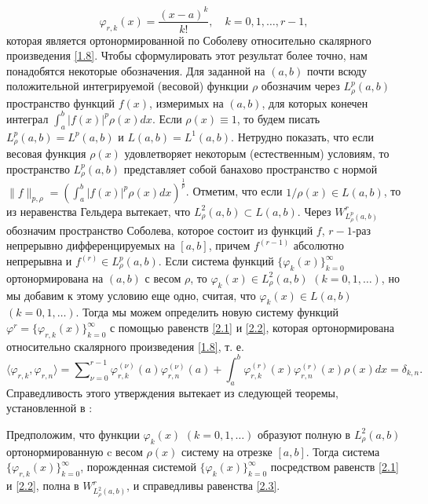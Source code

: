 \begin{equation}\label{2.2}
\varphi_{r,k}(x) =\frac{(x-a)^k}{k!}, \quad k=0,1,\ldots, r-1,
\end{equation}
которая является   ортонормированной по Соболеву относительно скалярного произведения \eqref{1.8}. Чтобы сформулировать  этот результат более точно, нам понадобятся некоторые обозначения. Для заданной на $(a,b)$ почти всюду положительной интегрируемой  (весовой) функции $\rho$ обозначим через $L^p_\rho(a,b)$  пространство  функций $f(x)$, измеримых  на  $(a,b)$, для которых конечен интеграл $\int_a^b|f(x)|^p\rho(x)dx$. Если $\rho(x)\equiv1$, то будем писать $L^p_\rho(a,b)=L^p(a,b)$ и $L(a,b)=L^1(a,b)$. Нетрудно показать, что если весовая функция $\rho(x)$ удовлетворяет некоторым (естественным) условиям, то пространство $L^p_\rho(a,b)$ представляет собой банахово пространство с нормой $\|f\|_{p,\rho}=(\int_a^b|f(x)|^p\rho(x)dx)^\frac1p$. Отметим, что если $1/\rho(x)\in L(a,b)$, то из  неравенства Гельдера вытекает, что $L^2_\rho(a,b)\subset L(a,b)$. Через $W^r_{L^p_\rho(a,b)}$ обозначим пространство Соболева, которое состоит из функций $f$, $r-1$-раз непрерывно дифференцируемых на $[a,b]$, причем $f^{(r-1)}$ абсолютно непрерывна и  $f^{(r)}\in L^p_\rho(a,b)$. Если система функций $\{\varphi_k(x)\}_{k=0}^\infty$ ортонормирована на $(a,b)$ с весом $\rho$, то $\varphi_k(x)\in L^2_\rho(a,b)$ $(k=0,1,\ldots)$, но мы добавим к этому условию еще одно, считая, что $\varphi_k(x)\in L(a,b)$ $(k=0,1,\ldots)$. Тогда мы можем определить новую систему функций $\varphi^r=\{\varphi_{r,k}(x)\}_{k=0}^\infty$ с помощью равенств \eqref{2.1} и \eqref{2.2}, которая ортонормирована относительно скалярного произведения \eqref{1.8}, т. е.
\begin{equation}\label{2.3}
\langle\varphi_{r,k},\varphi_{r,n}\rangle=\sum\nolimits_{\nu=0}^{r-1}\varphi_{r,k}^{(\nu)}(a)\varphi_{r,n}^{(\nu)}(a)+
\int_{a}^{b}\varphi_{r,k}^{(r)}(x)\varphi_{r,n}^{(r)}(x)\rho(x)dx=\delta_{k,n}.
\end{equation}
Справедливость этого утверждения вытекает из следующей теоремы,   установленной в \cite{SharIzv2018}:
\begin{theorem}\label{th1} Предположим, что    функции $\varphi_k(x)$ $(k=0,1,\ldots)$ образуют полную в $L^2_\rho(a,b)$ ортонормированную   c весом   $\rho(x)$ систему на отрезке $[a,b]$. Тогда система $\{\varphi_{r,k}(x)\}_{k=0}^\infty$, порожденная системой $\{\varphi_{k}(x)\}_{k=0}^\infty$ посредством равенств \eqref{2.1} и \eqref{2.2}, полна  в $W^r_{L^2_\rho(a,b)}$, и справедливы равенства \eqref{2.3}.
\end{theorem}

